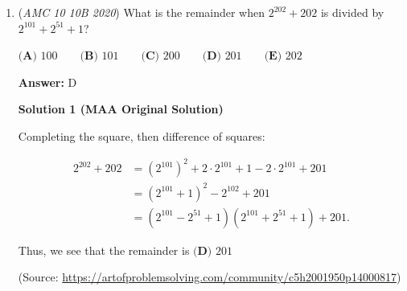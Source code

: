 \begin{enumerate}
 



\textbf{Solution 8}

We extend $\overline{FB}$ and $\overline{IE}$ to meet at a point $X$. Since $\angle AEI = \angle BEX$ and $FX$ is parallel to $DA$, we know that $\triangle{BEX} \sim \triangle{AEH}$, and because $\angle BXE = \angle IXF$ and $\angle XBE = \angle XIF$, we can conclude that $\triangle{BEX} \sim \triangle{AEH} \sim \triangle{IFX}$. 

 Now, because $\triangle{AEH}$ is isosceles, right, and has an area of 1, we can conclude that $AE = AH = \sqrt{2}$ and that $BE = 2-\sqrt{2}$. Armed with this knowledge, and setting $IF = a$ and the area of $\triangle{BEX} = b$, we can use similarity to say that 
 \[(\frac{a}{2-\sqrt{2}})^2 = \frac{1+b}{b}\]Since we know the side lengths of $\triangle{BEX}$ due to the fact that it is also an isosceles right triangle, we know that the area is $\frac{(2-\sqrt{2})^2}{2}$.Simplifying further and plugging in values, we have
 \[\frac{a^2}{(2-\sqrt{2})^2} = 1 + \frac{2}{(2-\sqrt{2})^2)}\]Multiplying by $(2-\sqrt{2})^2$ on both sides, we get 
 \[a^2 = (2-\sqrt{2})^2 + 2 = \boxed{\textbf{(B)}\ 8-4\sqrt{2}}\]~yingkai\_0\_

 \textbf{Really Good Vid Explanation} 


	\item (\textit{AMC 10 10B 2020}) What is the remainder when $2^{202} +202$ is divided by $2^{101}+2^{51}+1$?


 $\textbf{(A) } 100 \qquad\textbf{(B) } 101 \qquad\textbf{(C) } 200 \qquad\textbf{(D) } 201 \qquad\textbf{(E) } 202$

 \textbf{Answer: }D



\textbf{Solution 1 (MAA Original Solution)}

Completing the square, then difference of squares:

 
 \begin{align*} 2^{202} + 202 &= (2^{101})^2 + 2\cdot 2^{101} + 1 - 2\cdot 2^{101} + 201\\ &= (2^{101} + 1)^2 - 2^{102} + 201\\ &= (2^{101} - 2^{51} + 1)(2^{101} + 2^{51} + 1) + 201. \end{align*}


 
Thus, we see that the remainder is $\boxed{\textbf{(D) } 201}$

 (Source: \href{https://artofproblemsolving.com/community/c5h2001950p14000817}{https://artofproblemsolving.com/community/c5h2001950p14000817})


\end{enumerate}
